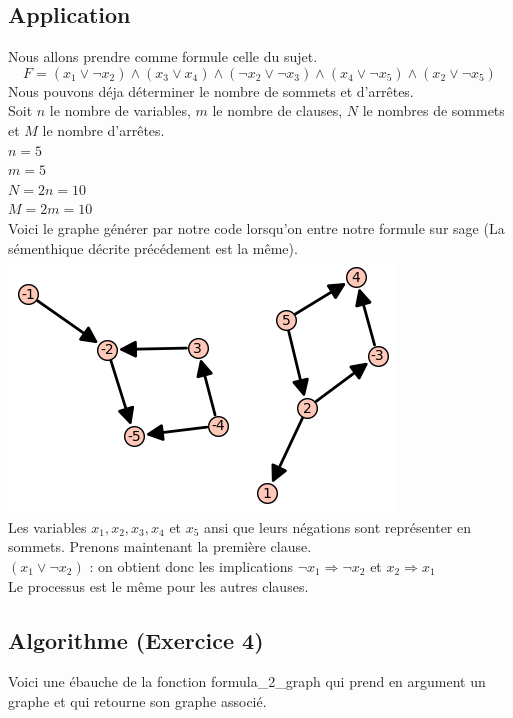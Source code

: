 \documentclass{article}
\begin{document}
    \subsection{Application}
    Nous allons prendre comme formule celle du sujet. 
    \begin{equation*}
        F=(x_1 \lor \neg x_2) \wedge (x_3 \lor x_4) \wedge (\neg x_2 \lor \neg x_3) \wedge (x_4 \lor \neg x_5) \wedge (x_2 \lor \neg x_5)
    \end{equation*}
    Nous pouvons déja déterminer le nombre de sommets et d'arrêtes. \\
    Soit $n$ le nombre de variables, $m$ le nombre de clauses, $N$ le nombres de sommets et $M$ le nombre d'arrêtes. \\
    $n=5$ \\
    $m=5$ \\
    $N=2n=10$ \\
    $M=2m=10$ \\ 
    Voici le graphe générer par notre code lorsqu'on entre notre formule sur sage (La sémenthique décrite précédement est la même). \\ 
    \includegraphics{g.png} \\
    Les variables $x_1,x_2,x_3,x_4$ et $x_5$ ansi que leurs négations sont représenter en sommets.
    Prenons maintenant la première clause. \\
    $(x_1 \lor \neg x_2)$ : on obtient donc les implications $\neg x_1 \Longrightarrow \neg x_2$ et $x_2 \Longrightarrow x_1$ \\
    Le processus est le même pour les autres clauses.
    \newpage
    \subsection{Algorithme (Exercice 4)}
    Voici une ébauche de la fonction formula\_2\_graph qui prend en argument un graphe et qui retourne son graphe associé.
\end{document}
